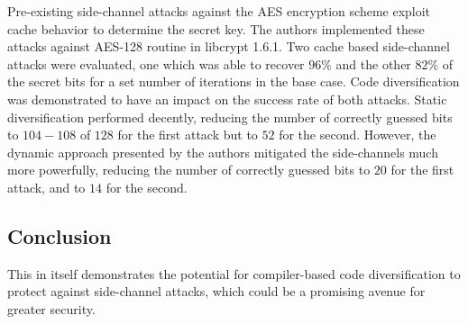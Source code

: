 Pre-existing side-channel attacks against the AES encryption scheme exploit
cache behavior to determine the secret key. The authors implemented these
attacks against AES-128 routine in libcrypt 1.6.1. Two cache based side-channel
attacks were evaluated, one which was able to recover $96\%$ and the other $82\%$ of
the secret bits for a set number of iterations in the base case. Code
diversification was demonstrated to have an impact on the success rate of both
attacks. Static diversification performed decently, reducing the number of
correctly guessed bits to $104-108$ of $128$ for the first attack but to $52$ for the
second. However, the dynamic approach presented by the authors mitigated the
side-channels much more powerfully, reducing the number of correctly guessed
bits to $20$ for the first attack, and to $14$ for the second. 
\subsection{Conclusion}
This in itself demonstrates the potential for compiler-based code diversification to
protect against side-channel attacks, which could be a promising avenue for
greater security.
